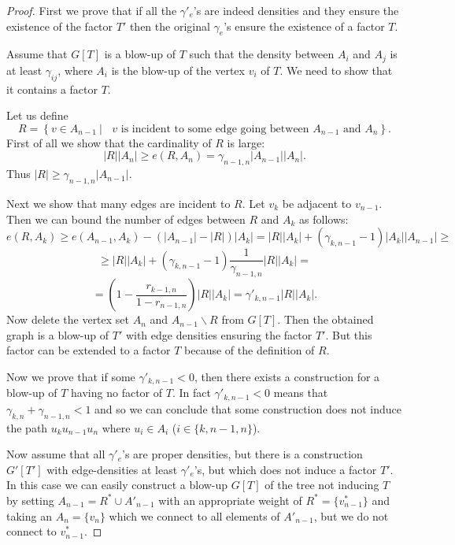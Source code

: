 \documentclass[12pt,a4paper]{amsart}
\numberwithin{equation}{section}
\begin{document}
\begin{proof} First we prove that if all the $\gamma'_e$'s are indeed
  densities and they ensure the existence of the factor  $T'$ then the original
  $\gamma_e$'s ensure the existence of a factor $T$.

Assume that $G[T]$ is a blow-up of $T$ such that the density between $A_i$
and $A_j$ is at least $\gamma_{ij}$, where $A_i$ is the blow-up of the vertex
$v_i$ of $T$. We need to show that it contains a
factor $T$. 

Let us define
$$R=\left\{ v\in A_{n-1}\ |\  \mbox{ $v$ is incident to some edge going between
    $A_{n-1}$ and $A_n$} \right\} .$$
First of all we show that the cardinality of $R$ is large:
$$|R||A_n|\geq e(R,A_n)=\gamma_{n-1,n}|A_{n-1}||A_n|.$$
Thus $|R|\geq \gamma_{n-1,n}|A_{n-1}|$. 

Next we show that many edges are
incident to $R$. Let $v_k$ be adjacent to $v_{n-1}$.  Then we can bound the
number of edges between $R$ and $A_{k}$ as follows:
$$e(R,A_k)\geq e(A_{n-1},A_k)-(|A_{n-1}|-|R|)|A_k|=
|R||A_k|+(\gamma_{k,n-1}-1)|A_k||A_{n-1}|\geq $$
$$\geq |R||A_k|+(\gamma_{k,n-1}-1)\frac{1}{\gamma_{n-1,n}}|R||A_k|=$$
$$=(1-\frac{r_{k-1,n}}{1-r_{n-1,n}})|R||A_k|=\gamma'_{k,n-1}|R||A_k|.$$
Now delete the vertex set $A_n$ and $A_{n-1}\backslash R$ from $G[T]$. Then the
obtained graph is a blow-up of $T'$ with edge densities ensuring the factor
$T'$. But this factor can be extended to a factor $T$ because of the
definition of $R$.

Now we prove that if some $\gamma'_{k,n-1}<0$, then there exists a construction
for a blow-up of $T$ having no factor of $T$.  In fact $\gamma'_{k,n-1}<0$
means that $\gamma_{k,n}+\gamma_{n-1,n}<1$ and so we can conclude that
some construction does not induce the path $u_ku_{n-1}u_n$ where $u_i\in A_i$
 ($i\in \{ k,n-1,n\}$). 

Now assume that all $\gamma'_e$'s are proper densities, but there is a
construction $G'[T']$ with edge-densities at least $\gamma'_e$'s, but which
does not induce a factor $T'$. In this case we can easily construct a blow-up
$G[T]$ of the tree not inducing $T$ by setting $A_{n-1}=R^*\cup A'_{n-1}$ with an
appropriate weight of $R^*=\{v_{n-1}^*\}$ and taking an $A_n=\{v_n\}$ which we
connect to all elements of $A'_{n-1}$, but we do not connect to $v_{n-1}^*$.     
\end{proof}  
\end{document}
